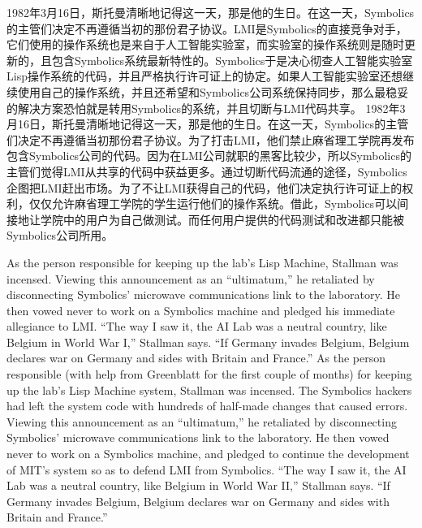 \ifdefined\chs
\ifdefined\vone
1982年3月16日，斯托曼清晰地记得这一天，那是他的生日。在这一天，Symbolics的主管们决定不再遵循当初的那份君子协议。LMI是Symbolics的直接竞争对手，它们使用的操作系统也是来自于人工智能实验室，而实验室的操作系统则是随时更新的，且包含Symbolics系统最新特性的。Symbolics于是决心彻查人工智能实验室Lisp操作系统的代码，并且严格执行许可证上的协定。如果人工智能实验室还想继续使用自己的操作系统，并且还希望和Symbolics公司系统保持同步，那么最稳妥的解决方案恐怕就是转用Symbolics的系统，并且切断与LMI代码共享\ifdefined\spv{}\fi 。
\fi
\ifdefined\vtwo
1982年3月16日，斯托曼清晰地记得这一天，那是他的生日。在这一天，Symbolics的主管们决定不再遵循当初那份君子协议。为了打击LMI，他们禁止麻省理工学院再发布包含Symbolics公司的代码。因为在LMI公司就职的黑客比较少，所以Symbolics的主管们觉得LMI从共享的代码中获益更多。通过切断代码流通的途径，Symbolics企图把LMI赶出市场。为了不让LMI获得自己的代码，他们决定执行许可证上的权利，仅仅允许麻省理工学院的学生运行他们的操作系统。借此，Symbolics可以间接地让学院中的用户为自己做测试。而任何用户提供的代码测试和改进都只能被Symbolics公司所用。
\fi
\fi

\ifdefined\eng
\ifdefined\vone
As the person responsible for keeping up the lab's Lisp Machine, Stallman was incensed. Viewing this announcement as an ``ultimatum,'' he retaliated by disconnecting Symbolics' microwave communications link to the laboratory. He then vowed never to work on a Symbolics machine and pledged his immediate allegiance to LMI. ``The way I saw it, the AI Lab was a neutral country, like Belgium in World War I,'' Stallman says. ``If Germany invades Belgium, Belgium declares war on Germany and sides with Britain and France.''
\fi
\ifdefined\vtwo
As the person responsible (with help from Greenblatt for the first couple of months) for keeping up the lab's Lisp Machine system, Stallman was incensed. The Symbolics hackers had left the system code with hundreds of half-made changes that caused errors. Viewing this announcement as an ``ultimatum,'' he retaliated by disconnecting Symbolics' microwave communications link to the laboratory. He then vowed never to work on a Symbolics machine, and pledged to continue the development of MIT's system so as to defend LMI from Symbolics. ``The way I saw it, the AI Lab was a neutral country, like Belgium in World War II,'' Stallman says. ``If Germany invades Belgium, Belgium declares war on Germany and sides with Britain and France.''
\fi
\fi

